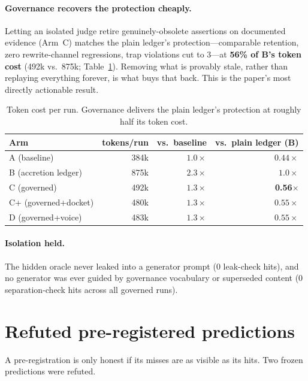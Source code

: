\documentclass[11pt]{article}
\begin{document}
\paragraph{Governance recovers the protection cheaply.} Letting an isolated
judge retire genuinely-obsolete assertions on documented evidence (Arm~C)
matches the plain ledger's protection---comparable retention, zero
rewrite-channel regressions, trap violations cut to 3---at
\textbf{56\% of B's token cost} (492k vs.\ 875k; Table~\ref{tab:tokens}).
Removing what is provably stale, rather than replaying everything forever, is
what buys that back. This is the paper's most directly actionable result.

\begin{table}[t]
\centering
\small
\begin{tabular}{lrrr}
\toprule
Arm & tokens/run & vs.\ baseline & vs.\ plain ledger (B) \\
\midrule
A (baseline)         & 384k & $1.0\times$ & $0.44\times$ \\
B (accretion ledger) & 875k & $2.3\times$ & $1.0\times$ \\
C (governed)         & 492k & $1.3\times$ & \textbf{0.56}$\times$ \\
C+ (governed+docket) & 480k & $1.3\times$ & $0.55\times$ \\
D (governed+voice)   & 483k & $1.3\times$ & $0.55\times$ \\
\bottomrule
\end{tabular}
\caption{Token cost per run. Governance delivers the plain ledger's
protection at roughly half its token cost.}
\label{tab:tokens}
\end{table}

\paragraph{Isolation held.} The hidden oracle never leaked into a generator
prompt (0 leak-check hits), and no generator was ever guided by governance
vocabulary or superseded content (0 separation-check hits across all governed
runs).

\section{Refuted pre-registered predictions}
\label{sec:refuted}

A pre-registration is only honest if its misses are as visible as its hits.
Two frozen predictions were refuted.
\end{document}
